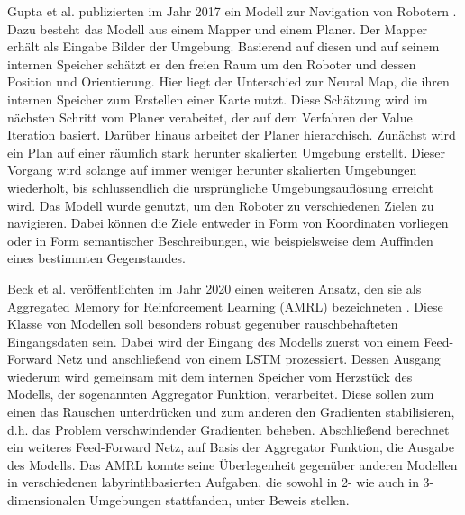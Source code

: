Gupta et al. publizierten im Jahr 2017 ein Modell zur Navigation von Robotern \cite{MappingPlanning}. Dazu besteht das Modell aus einem Mapper und einem Planer. Der Mapper erhält als Eingabe Bilder der Umgebung. Basierend auf diesen und auf seinem internen Speicher schätzt er den freien Raum um den Roboter und dessen Position und Orientierung. Hier liegt der Unterschied zur Neural Map, die ihren internen Speicher zum Erstellen einer Karte nutzt. Diese Schätzung wird im nächsten Schritt vom Planer verabeitet, der auf dem Verfahren der Value Iteration basiert. Darüber hinaus arbeitet der Planer hierarchisch. Zunächst wird ein Plan auf einer räumlich stark herunter skalierten Umgebung erstellt. Dieser Vorgang wird solange auf immer weniger herunter skalierten Umgebungen wiederholt, bis schlussendlich die ursprüngliche Umgebungsauflösung erreicht wird. Das Modell wurde genutzt, um den Roboter zu verschiedenen Zielen zu navigieren. Dabei können die Ziele entweder in Form von Koordinaten vorliegen oder in Form semantischer Beschreibungen, wie beispielsweise dem Auffinden eines bestimmten Gegenstandes.

Beck et al. veröffentlichten im Jahr 2020 einen weiteren Ansatz, den sie als Aggregated Memory for Reinforcement Learning (AMRL) bezeichneten \cite{AMRL}. Diese Klasse von Modellen soll besonders robust gegenüber rauschbehafteten Eingangsdaten sein. Dabei wird der Eingang des Modells zuerst von einem Feed-Forward Netz und anschließend von einem LSTM prozessiert. Dessen Ausgang wiederum wird gemeinsam mit dem internen Speicher vom Herzstück des Modells, der sogenannten Aggregator Funktion, verarbeitet. Diese sollen zum einen das Rauschen unterdrücken und zum anderen den Gradienten stabilisieren, d.h. das Problem verschwindender Gradienten beheben. Abschließend berechnet ein weiteres Feed-Forward Netz, auf Basis der Aggregator Funktion, die Ausgabe des Modells. Das AMRL konnte seine Überlegenheit gegenüber anderen Modellen in verschiedenen labyrinthbasierten Aufgaben, die sowohl in 2- wie auch in 3-dimensionalen Umgebungen stattfanden, unter Beweis stellen.

